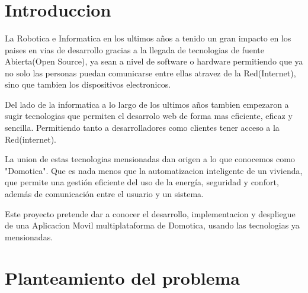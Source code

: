 \documentclass[letterpaper,12pt]{article}
\begin{document}
{\begin{center}
\begin{minipage}[b]{5cm}
			\end{minipage}\\
			[4cm]
			
			{\fontsize{12}{3}\selectfont{Cochabamba, 2018}}\\[1cm]
		\end{center}
		
		
		
		\vspace{1cm}
		\ %
		
		
		
		\tableofcontents
		\newpage
		
		
		
		\section{Introduccion}
		\vspace{1cm}
		
		La Robotica e Informatica en los ultimos años a tenido un gran impacto en los paises en vias de desarrollo gracias a la llegada de tecnologias de fuente Abierta(Open Source), ya sean a nivel de software o hardware  permitiendo que ya no solo las personas  puedan comunicarse entre ellas atravez de la Red(Internet), sino que tambien los dispositivos electronicos.
		
		Del lado de la informatica a lo largo de los ultimos años tambien  empezaron a sugir tecnologias que permiten el desarrolo web de forma mas eficiente, eficaz y sencilla. Permitiendo tanto a desarrolladores como clientes tener acceso  a la Red(internet).
		
		
		La union de estas tecnologias mensionadas dan origen a lo que conocemos como "Domotica". Que es nada menos que la automatizacion inteligente de un vivienda, que permite una gestión eficiente del uso de la energía, seguridad y confort, además de comunicación entre el usuario y un sistema. 
		
		Este proyecto pretende dar a conocer el desarrollo, implementacion  y despliegue de una Aplicacion Movil multiplataforma de Domotica, usando las tecnologias ya mensionadas.
		
		
		\section{Planteamiento del problema}
}
\end{document}

